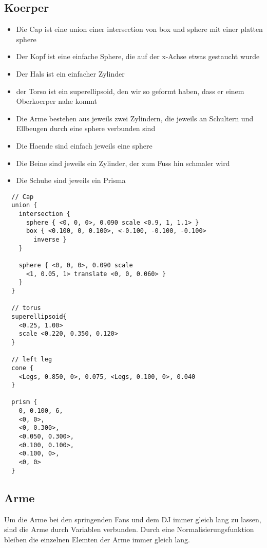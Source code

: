 \documentclass[paper=a4]{scrartcl}
\begin{document}
\subsection{Koerper}
\begin{itemize}
  \item Die Cap ist eine union einer intersection von box und sphere mit einer platten sphere
  \item Der Kopf ist eine einfache Sphere, die auf der x-Achse etwas gestaucht wurde
  \item Der Hals ist ein einfacher Zylinder
  \item der Torso ist ein superellipsoid, den wir so geformt haben, dass er einem Oberkoerper nahe kommt
  \item Die Arme bestehen aus jeweils zwei Zylindern, die jeweils an Schultern und Ellbeugen durch eine sphere verbunden sind
  \item Die Haende sind einfach jeweils eine sphere
  \item Die Beine sind jeweils ein Zylinder, der zum Fuss hin schmaler wird
  \item Die Schuhe sind jeweils ein Prisma
\end{itemize}

\newpage

\begin{lstlisting}
  // Cap
  union {
    intersection {
      sphere { <0, 0, 0>, 0.090 scale <0.9, 1, 1.1> }
      box { <0.100, 0, 0.100>, <-0.100, -0.100, -0.100>
        inverse }
    }

    sphere { <0, 0, 0>, 0.090 scale
      <1, 0.05, 1> translate <0, 0, 0.060> }
    }
  }

  // torus
  superellipsoid{
    <0.25, 1.00>
    scale <0.220, 0.350, 0.120>
  }

  // left leg
  cone {
    <Legs, 0.850, 0>, 0.075, <Legs, 0.100, 0>, 0.040
  }

  prism {
    0, 0.100, 6,
    <0, 0>,
    <0, 0.300>,
    <0.050, 0.300>,
    <0.100, 0.100>,
    <0.100, 0>,
    <0, 0>
  }
\end{lstlisting}

\newpage

\subsection{Arme}
Um die Arme bei den springenden Fans und dem DJ immer gleich lang zu lassen, sind die Arme durch Variablen verbunden.
Durch eine Normalisierungsfunktion bleiben die einzelnen Elemten der Arme immer gleich lang.
\end{document}
